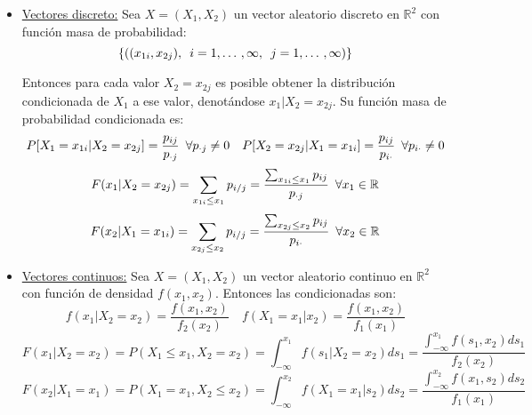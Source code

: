 \documentclass[a4paper, 11pt]{article}
\newcommand{\R}[1][]{\mathbb{R}^{#1}}
\begin{document}
\begin{itemize}
\item \underline{Vectores discreto:} Sea $X=(X_1,X_2)$ un vector aleatorio discreto en $\R[2]$ con función masa de probabilidad:
\[
\{\left((x_{1i},x_{2j}), \enskip i=1,\dotso, \infty, \enskip j=1,\dotso, \infty\right)\}
\]

Entonces para cada valor $X_2=x_{2j}$ es posible obtener la distribución condicionada de $X_1$ a ese valor, denotándose $x_1|X_2=x_{2j}$. Su función masa de probabilidad condicionada es:
\[
P[X_1=x_{1i}|X_2=x_{2j}]=\frac{p_{ij}}{p_{\cdot j}} \enskip \forall p_{\cdot j} \neq 0 \quad P[X_2=x_{2j}|X_1=x_{1i}]=\frac{p_{ij}}{p_{i\cdot}} \enskip \forall p_{i\cdot} \neq 0
\]
\[
F(x_1|X_2=x_{2j})=\sum_{x_{1i}\leq x_1}p_{i/j}=\frac{\sum_{x_{1i}\leq x_1}p_{ij}}{p_{\cdot j}} \enskip \forall x_1\in\R
\]
\[
F(x_2|X_1=x_{1i})=\sum_{x_{2j}\leq x_2}p_{i/j}=\frac{\sum_{x_{2j}\leq x_2}p_{ij}}{p_{i\cdot}} \enskip \forall x_2\in\R
\]

\item \underline{Vectores continuos:}  Sea $X=(X_1,X_2)$ un vector aleatorio continuo en $\R[2]$ con función de densidad $f(x_1,x_2)$. Entonces las condicionadas son:
\[
f(x_1|X_2=x_2)=\frac{f(x_1,x_2)}{f_2(x_2)} \quad f(X_1=x_1|x_2)=\frac{f(x_1,x_2)}{f_1(x_1)}
\]
\[
F(x_1|X_2=x_2)=P(X_1\leq x_1,X_2=x_2)=\int_{-\infty}^{x_1}f(s_1|X_2=x_2)ds_1=\frac{\displaystyle\int_{-\infty}^{x_1}f(s_1,x_2)ds_1}{f_2(x_2)}
\]
\[
F(x_2|X_1=x_1)=P(X_1=x_1,X_2\leq x_2)=\int_{-\infty}^{x_2}f(X_1=x_1|s_2)ds_2=\frac{\displaystyle\int_{-\infty}^{x_2}f(x_1,s_2)ds_2}{f_1(x_1)}
\]

\end{itemize}
\end{document}
